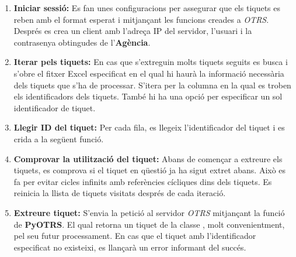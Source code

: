 \begin{enumerate}
     \item \textbf{Iniciar sessió:} Es fan unes configuracions per assegurar que els tiquets es reben amb el format esperat i mitjançant les funcions creades a \textit{OTRS}. Després es crea un client amb l'adreça IP del servidor, l'usuari i la contrasenya obtingudes de l'\textbf{Agència}.
     \item \textbf{Iterar pels tiquets:} En cas que s'extreguin molts tiquets seguits es busca i s'obre el fitxer Excel especificat en el qual hi haurà la informació necessària dels tiquets que s'ha de processar. S'itera per la columna en la qual es troben els identificadors dels tiquets. També hi ha una opció per especificar un sol identificador de tiquet.
     \item \textbf{Llegir ID del tiquet:} Per cada fila, es llegeix l'identificador del tiquet i es crida a la següent funció.
     \item \textbf{Comprovar la utilització del tiquet:} Abans de començar a extreure els tiquets, es comprova si el tiquet en qüestió ja ha sigut extret abans. Això es fa per evitar cicles infinits amb referències cícliques dins dels tiquets. Es reinicia la llista de tiquets visitats després de cada iteració.
     \item \textbf{Extreure tiquet:} S'envia la petició al servidor \textit{OTRS} mitjançant la funció \linebreak {} de \textbf{PyOTRS}. El qual retorna un tiquet de la classe , molt convenientment, pel seu futur processament. En cas que el tiquet amb l'identificador especificat no existeixi, es llançarà un error informant del succés.
\end{enumerate}


